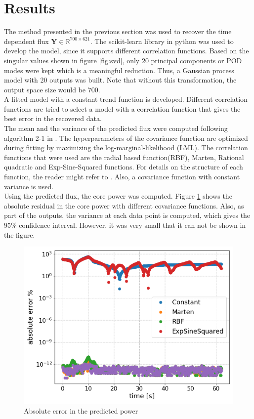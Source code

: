 \documentclass{anstrans}
\begin{document}
\section{Results}
The method presented in the previous section was used to recover the time dependent flux $\textbf{Y} \in \mathbb{R}^{700\times 621}$. The scikit-learn library in python\cite{scikit-learn} was used to develop the model, since it supports different correlation functions.
Based on the singular values shown in figure \ref{fig:svd}, only 20 principal components or POD modes were kept which is a meaningful reduction. Thus, a Gaussian process model with 20 outputs was built. Note that without this transformation, the output space size would be 700.\\
A fitted model with a constant trend function is developed. Different correlation functions are tried to   select a model with a correlation function that gives the best error in the recovered data. \\
The mean and the variance of the predicted flux were computed following algorithm 2-1 in \cite{rasmussen2003gaussian}. The hyperparameters of the covariance function are optimized during fitting by maximizing the log-marginal-likelihood (LML).
The correlation functions that were used are the radial based function(RBF), Marten, Rational quadratic and Exp-Sine-Squared functions.
For details on the structure of each function, the reader might refer to \cite{rasmussen2003gaussian}. Also, a covariance function with constant variance is used.\\
Using the predicted flux, the core power was computed. Figure \ref{gp_kernels} shows the absolute residual in the core power with different covariance functions.
Also, as part of the outputs, the variance at each data point is computed, which gives the $95\%$ confidence interval. However, it was very small that it can not be shown in the figure.
\begin{figure}[ht!]
	\includegraphics[scale=0.4]{./figs/gp_kernels.png}
	\caption{Absolute error in the predicted power}
	\label{gp_kernels}
\end{figure}
\end{document}
